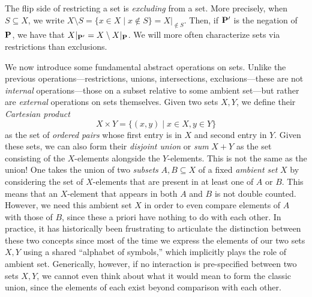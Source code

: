 The flip side of restricting a set is \emph{excluding} from a set. More precisely, when $S\subseteq X$, we write $X\setminus S=\{x\in X\mid x\notin S\}=X|_{\notin S}$. Then, if $\mathbf P'$ is the negation of $\mathbf P$, we have that $X|_{\mathbf P'}=X\setminus X|_{\mathbf P}$. We will more often characterize sets via restrictions than exclusions.

We now introduce some fundamental abstract operations on sets. Unlike the previous operations---restrictions, unions, intersections, exclusions---these are not \emph{internal} operations---those on a subset relative to some ambient set---but rather are \emph{external} operations on sets themselves. Given two sets $X,Y$, we define their \emph{Cartesian product} 
\[X\times Y =\{(x,y)\mid x\in X,y\in Y\}\]
as the set of \emph{ordered pairs} whose first entry is in $X$ and second entry in $Y$. Given these sets, we can also form their \emph{disjoint union} or \emph{sum} $X+Y$ as the set consisting of the $X$-elements alongside the $Y$-elements. This is not the same as the union! One takes the union of two \emph{subsets} $A,B\subseteq X$ of a fixed \emph{ambient set} $X$ by considering the set of $X$-elements that are present in at least one of $A$ or $B$. This means that an $X$-element that appears in both $A$ and $B$ is not double counted. However, we need this ambient set $X$ in order to even compare elements of $A$ with those of $B$, since these a priori have nothing to do with each other. In practice, it has historically been frustrating to articulate the distinction between these two concepts since most of the time we express the elements of our two sets $X,Y$ using a shared ``alphabet of symbols,'' which implicitly plays the role of ambient set. Generically, however, if no interaction is pre-specified between two sets $X,Y$, we cannot even think about what it would mean to form the classic union, since the elements of each exist beyond comparison with each other.

